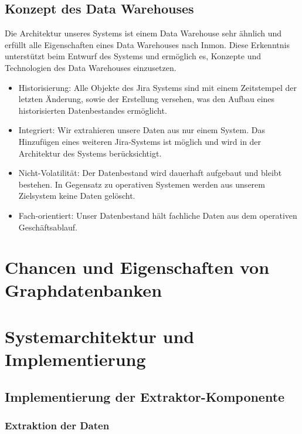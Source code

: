 \documentclass[10pt]{article}
\begin{document}
\subsection{Konzept des Data Warehouses}
Die Architektur unseres Systems ist einem Data Warehouse sehr ähnlich und erfüllt alle Eigenschaften eines Data Warehouses nach Inmon. Diese Erkenntnis unterstützt beim Entwurf des Systems und ermöglich es, Konzepte und Technologien des Data Warehouses einzusetzen.
\begin{itemize}
  \item Historisierung: Alle Objekte des Jira Systems sind mit einem Zeitstempel der letzten Änderung, sowie der Erstellung versehen, was den Aufbau eines historisierten Datenbestandes ermöglicht.
  \item Integriert: Wir extrahieren unsere Daten aus nur einem System. Das Hinzufügen eines weiteren Jira-Systems ist möglich und wird in der Architektur des Systems berücksichtigt.
  \item Nicht-Volatilität: Der Datenbestand wird dauerhaft aufgebaut und bleibt bestehen. In Gegensatz zu operativen Systemen werden aus unserem Zielsystem keine Daten gelöscht.
  \item Fach-orientiert: Unser Datenbestand hält fachliche Daten aus dem operativen Geschäftsablauf.
\end{itemize}
\section{Chancen und Eigenschaften von Graphdatenbanken}
\newpage
\section{Systemarchitektur und Implementierung}
\subsection{Implementierung der Extraktor-Komponente}
\subsubsection{Extraktion der Daten}
\end{document}
